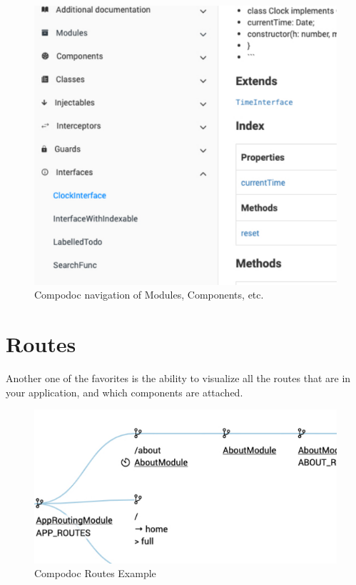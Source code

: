 \begin{figure}[!ht]
\caption{Compodoc navigation of Modules, Components, etc.}
\includegraphics[width=414pt]{graphics/compodoc/nav/compodoc-nav-screenshot.pdf}
\end{figure}

\section{Routes}
Another one of the favorites is the ability to visualize all the routes that are in your application, and which components are attached. 

\begin{figure}[!ht]
\caption{Compodoc Routes Example}
\includegraphics[width=414pt]{graphics/compodoc/routes/compodoc-routes.pdf}
\end{figure}


